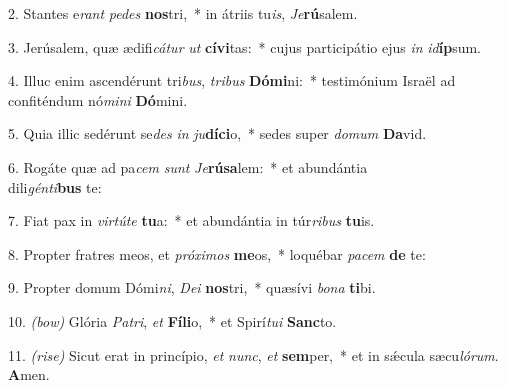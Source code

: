 2. Stantes e\textit{rant} \textit{pe}\textit{des} \textbf{nos}tri,~* 
	in átriis tu\textit{is}, \textit{Je}\textbf{rú}salem.

3. Jerúsalem, quæ ædifi\textit{cá}\textit{tur} \textit{ut} \textbf{cí}\textbf{vi}tas:~* 
	cujus participátio ejus \textit{in} \textit{id}\textbf{íp}sum.

4. Illuc enim ascendérunt tri\textit{bus}, \textit{tri}\textit{bus} \textbf{Dó}\textbf{mi}ni:~* 
	testimónium Israël ad confiténdum nó\textit{mi}\textit{ni} \textbf{Dó}mini.

5. Quia illic sedérunt se\textit{des} \textit{in} \textit{ju}\textbf{dí}\textbf{ci}o,~* 
	sedes super \textit{do}\textit{mum} \textbf{Da}vid.

6. Rogáte quæ ad pa\textit{cem} \textit{sunt} \textit{Je}\textbf{rú}\textbf{sa}lem:~* 
	et abundántia\\ dili\textit{gén}\textit{ti}\textbf{bus} te:

7. Fiat pax in \textit{vir}\textit{tú}\textit{te} \textbf{tu}a:~* 
	et abundántia in túr\textit{ri}\textit{bus} \textbf{tu}is.

8. Propter fratres meos, et \textit{pró}\textit{xi}\textit{mos} \textbf{me}os,~* 
	loquébar \textit{pa}\textit{cem} \textbf{de} te:

9. Propter domum Dómi\textit{ni}, \textit{De}\textit{i} \textbf{nos}tri,~* 
	quæsívi \textit{bo}\textit{na} \textbf{ti}bi.

10. {\color{red}\textit{(bow)}} Glória \textit{Pa}\textit{tri}, \textit{et} \textbf{Fí}\textbf{li}o,~* 
	et Spirí\textit{tu}\textit{i} \textbf{Sanc}to.

11. {\color{red}\textit{(rise)}} Sicut erat in princípio, \textit{et} \textit{nunc}, \textit{et} \textbf{sem}per,~* 
	et in s\'{\ae}cula sæcu\textit{ló}\textit{rum}. \textbf{A}men.